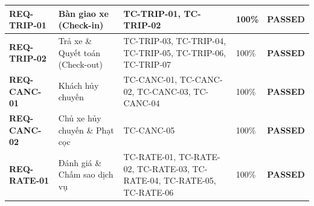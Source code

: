 {\begin{longtable}{p{2.3cm}p{3.5cm}p{5.8cm}p{1.7cm}p{1.8cm}}
\textbf{REQ-TRIP-01} & Bàn giao xe (Check-in) & TC-TRIP-01, TC-TRIP-02 & 100\% & \textbf{PASSED} \\ \midrule
\textbf{REQ-TRIP-02} & Trả xe \& Quyết toán (Check-out) & TC-TRIP-03, TC-TRIP-04, TC-TRIP-05, TC-TRIP-06, TC-TRIP-07 & 100\% & \textbf{PASSED} \\ \midrule
\textbf{REQ-CANC-01} & Khách hủy chuyến & TC-CANC-01, TC-CANC-02, TC-CANC-03, TC-CANC-04 & 100\% & \textbf{PASSED} \\ \midrule
\textbf{REQ-CANC-02} & Chủ xe hủy chuyến \& Phạt cọc & TC-CANC-05 & 100\% & \textbf{PASSED} \\ \midrule
\textbf{REQ-RATE-01} & Đánh giá \& Chấm sao dịch vụ & TC-RATE-01, TC-RATE-02, TC-RATE-03, TC-RATE-04, TC-RATE-05, TC-RATE-06 & 100\% & \textbf{PASSED} \\ \midrule
\end{longtable}
}
